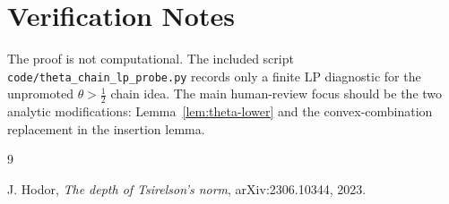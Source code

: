 \documentclass[11pt]{article}
\begin{document}
\section*{Verification Notes}

The proof is not computational.  The included script
\texttt{code/theta\_chain\_lp\_probe.py} records only a finite LP diagnostic for
the unpromoted \(\theta>\frac12\) chain idea.  The main human-review focus
should be the two analytic modifications: Lemma~\ref{lem:theta-lower} and the
convex-combination replacement in the insertion lemma.

\begin{thebibliography}{9}

J. Hodor,
\emph{The depth of Tsirelson's norm},
arXiv:2306.10344, 2023.

\end{thebibliography}
\end{document}
